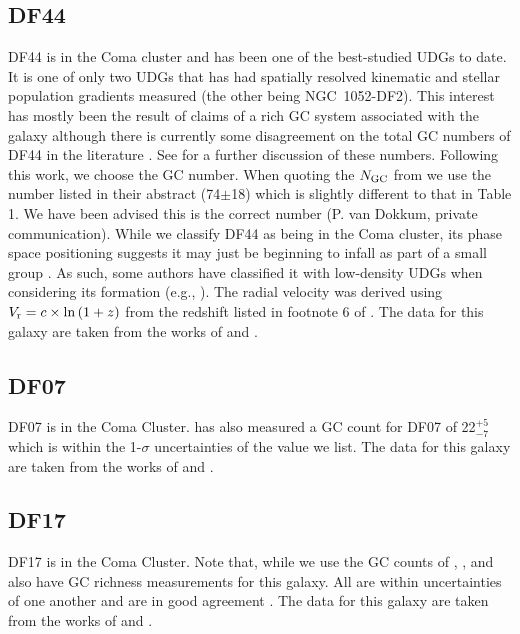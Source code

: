 \subsection{DF44}
DF44 is in the Coma cluster and has been one of the best-studied UDGs to date. It is one of only two UDGs that has had spatially resolved kinematic and stellar population gradients measured (the other being NGC~1052-DF2). This interest has mostly been the result of claims of a rich GC system associated with the galaxy \citet{vanDokkum2017} although there is currently some disagreement on the total GC numbers of DF44 in the literature \citep{Saifollahi2021, Saifollahi2022}. See \citet{Forbes2024} for a further discussion of these numbers. Following this work, we choose the \citet{vanDokkum2017} GC number. When quoting the $N_{\rm GC}$ from \citet{vanDokkum2017} we use the number listed in their abstract (74$\pm$18) which is slightly different to that in Table 1. We have been advised this is the correct number (P. van Dokkum, private communication). While we classify DF44 as being in the Coma cluster, its phase space positioning suggests it may just be beginning to infall as part of a small group \citep{vanDokkum2019b}. As such, some authors have classified it with low-density UDGs when considering its formation (e.g., \citealp{FerreMateu2023}).  The radial velocity was derived using $V_{\rm r} = c \times \ln{(1+z)}$ from the redshift listed in footnote 6 of \citet[$z=$0.02132]{vanDokkum2017}. The data for this galaxy are taken from the works of \citet{vanDokkum2016, vanDokkum2017, vanDokkum2019b, Gannon2021, Villaume2022, Webb2022} and \citet{Saifollahi2022}.

\subsection{DF07}
DF07 is in the Coma Cluster. \citet{Saifollahi2022} has also measured a GC count for DF07 of 22$^{+5}_{-7}$ which is within the 1-$\sigma$ uncertainties of the \citet{Lim2018} value we list. The data for this galaxy are taken from the works of \citet{vanDokkum2015, Gu2018, Lim2018} and \citet{FerreMateu2023}.

\subsection{DF17}
DF17 is in the Coma Cluster. Note that, while we use the GC counts of \citet{Saifollahi2022}, \citet{Peng2016}, \citet{Beasley2016b} and \citet{vanDokkum2017} also have GC richness measurements for this galaxy. All are within uncertainties of one another and are in good agreement \citep{Forbes2024}. The data for this galaxy are taken from the works of \citet{vanDokkum2017, Gu2018} and \citet{Saifollahi2022}.

